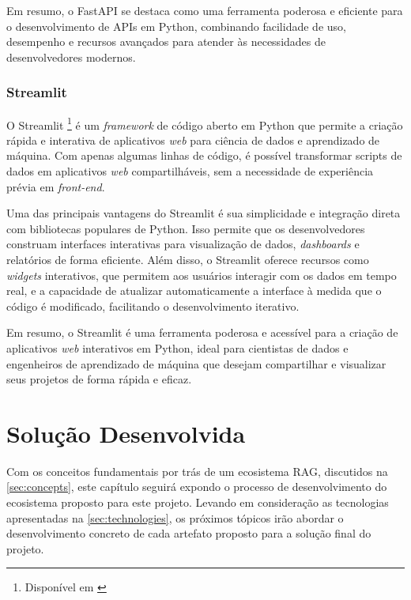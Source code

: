 \documentclass[a4paper, 12pt]{article}
\newcommand{\citeb}[1]{\bibleftbracket\cite{#1}\bibrightbracket}
\begin{document}
    Em resumo, o FastAPI se destaca como uma ferramenta poderosa e eficiente para o desenvolvimento de APIs em Python, combinando facilidade de uso, desempenho e recursos avançados para atender às necessidades de desenvolvedores modernos.

    \subsubsection{Streamlit} \label{sec:streamlit}
    
    O Streamlit \footnote{Disponível em \citeb{streamlit}} é um \textit{framework} de código aberto em Python que permite a criação rápida e interativa de aplicativos \textit{web} para ciência de dados e aprendizado de máquina. Com apenas algumas linhas de código, é possível transformar scripts de dados em aplicativos \textit{web} compartilháveis, sem a necessidade de experiência prévia em \textit{front-end}.

    Uma das principais vantagens do Streamlit é sua simplicidade e integração direta com bibliotecas populares de Python. Isso permite que os desenvolvedores construam interfaces interativas para visualização de dados, \textit{dashboards} e relatórios de forma eficiente. Além disso, o Streamlit oferece recursos como \textit{widgets} interativos, que permitem aos usuários interagir com os dados em tempo real, e a capacidade de atualizar automaticamente a interface à medida que o código é modificado, facilitando o desenvolvimento iterativo.

    Em resumo, o Streamlit é uma ferramenta poderosa e acessível para a criação de aplicativos \textit{web} interativos em Python, ideal para cientistas de dados e engenheiros de aprendizado de máquina que desejam compartilhar e visualizar seus projetos de forma rápida e eficaz.

    \clearpage

    \section{Solução Desenvolvida}

    Com os conceitos fundamentais por trás de um ecosistema RAG, discutidos na \autoref{sec:concepts}, este capítulo seguirá expondo o processo de desenvolvimento do ecosistema proposto para este projeto. Levando em consideração as tecnologias apresentadas na \autoref{sec:technologies}, os próximos tópicos irão abordar o desenvolvimento concreto de cada artefato proposto para a solução final do projeto.
\end{document}
